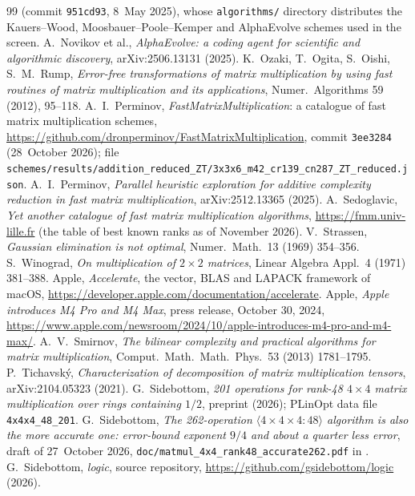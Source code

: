 \documentclass[11pt]{article}
\begin{document}
{\begin{thebibliography}{99}
(commit \texttt{951cd93}, 8~May 2025), whose \texttt{algorithms/} directory
distributes the Kauers--Wood, Moosbauer--Poole--Kemper and AlphaEvolve
schemes used in the screen.
 A.~Novikov et al., \emph{AlphaEvolve: a coding agent
for scientific and algorithmic discovery}, arXiv:2506.13131 (2025).
 K.~Ozaki, T.~Ogita, S.~Oishi, S.~M.~Rump, \emph{Error-free
transformations of matrix multiplication by using fast routines of matrix
multiplication and its applications}, Numer.\ Algorithms 59 (2012), 95--118.
 A.~I.~Perminov, \emph{FastMatrixMultiplication}: a
catalogue of fast matrix multiplication schemes,
\url{https://github.com/dronperminov/FastMatrixMultiplication}, commit
\texttt{3ee3284} (28~October 2026); file
\texttt{schemes/results/addition\_reduced\_ZT/3x3x6\_m42\_cr139\_cn287\_ZT\_reduced.json}.
 A.~I.~Perminov, \emph{Parallel heuristic exploration
for additive complexity reduction in fast matrix multiplication},
arXiv:2512.13365 (2025).
 A.~Sedoglavic, \emph{Yet another catalogue of fast matrix
multiplication algorithms}, \url{https://fmm.univ-lille.fr} (the table of
best known ranks as of November 2026).
 V.~Strassen, \emph{Gaussian elimination is not optimal},
Numer.\ Math.\ 13 (1969) 354--356.
 S.~Winograd, \emph{On multiplication of $2\times2$
matrices}, Linear Algebra Appl.\ 4 (1971) 381--388.
 Apple, \emph{Accelerate}, the vector, BLAS and LAPACK
framework of macOS, \url{https://developer.apple.com/documentation/accelerate}.
 Apple, \emph{Apple introduces M4 Pro and M4 Max}, press
release, October 30, 2024,
\url{https://www.apple.com/newsroom/2024/10/apple-introduces-m4-pro-and-m4-max/}.
 A.~V.~Smirnov, \emph{The bilinear complexity and
practical algorithms for matrix multiplication}, Comput.\ Math.\ Math.\
Phys.\ 53 (2013) 1781--1795.
 P.~Tichavsk\'y, \emph{Characterization of
decomposition of matrix multiplication tensors}, arXiv:2104.05323 (2021).
\bibitem{S26} G.~Sidebottom, \emph{201 operations for rank-48 $4\times4$
matrix multiplication over rings containing $1/2$}, preprint (2026);
PLinOpt data file \texttt{4x4x4\_48\_201}.
 G.~Sidebottom, \emph{The 262-operation
$\langle4\times4\times4:48\rangle$ algorithm is also the more accurate one:
error-bound exponent $9/4$ and about a quarter less error}, draft of
27~October 2026, \texttt{doc/matmul\_4x4\_rank48\_accurate262.pdf} in \cite{logic}.
\bibitem{logic} G.~Sidebottom, \emph{logic}, source repository,
\url{https://github.com/gsidebottom/logic} (2026).
\end{thebibliography}
}
\end{document}
